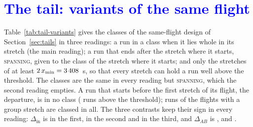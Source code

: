 \begin{table}
\centering\scriptsize
\setlength{\tabcolsep}{3pt}

\caption{Decomposition, level all, on \DecPiecesK{} pieces of $\G$ (\DecPiecesQ{} for $\Hq$, \DecPiecesPhase{} for the phase statistics): value of $\G$ and of the controls of each cell; the cells are named by the conditions they hold ($\emptyset$ none, R route, T season and hour, W wing).
Dataset 1000 for $\Hk$ and the statistics, 2760 for $\Hq$; average first, ratio after, unit the piece.}
\label{tab:decomposition-controls}
\end{table}

\begin{table}
\centering\scriptsize
\setlength{\tabcolsep}{3pt}

\caption{Decomposition, level all: $\Delta(C)=\G-{}$controls of the cell $C$ for the 8 cells (same pieces and units as Table~\ref{tab:decomposition-controls}); $^\ast$: the 90\% band excludes 0.}
\label{tab:decomposition-deltas}
\end{table}

\section{\texorpdfstring{\textcolor{blue}{The tail: variants of the same flight}}{The tail: variants of the same flight}}\label{app:tailvariants}

Table~\ref{tab:tail-variants} gives the classes of the same-flight design of Section~\ref{sec:tails} in three readings: a run in a class when it lies whole in its stretch (the main reading); a run that ends after the stretch where it starts, \textsc{spanning}, given to the class of the stretch where it starts; and only the stretches of at least $2\,x_{\min}=3\,408$~s, so that every stretch can hold a run well above the threshold.
The classes are the same in every reading but \textsc{spanning}, which the second reading empties. A run that starts before the first stretch of its flight, the departure, is in no class (\TlOutside{} runs above the threshold); \TlRunsClassified{} runs of the flights with a group stretch are classed in all. The three contrasts keep their sign in every reading: $\Delta_\text{in}$ is \TlFlightDeltaIn{} \TlFlightDeltaInBand{} in the first, \TlFlightStartDeltaIn{} \TlFlightStartDeltaInBand{} in the second and \TlFlightLongDeltaIn{} \TlFlightLongDeltaInBand{} in the third, and $\Delta_{AB}$ is \TlFlightDeltaAfterBefore, \TlFlightStartDeltaAfterBefore{} and \TlFlightLongDeltaAfterBefore.

